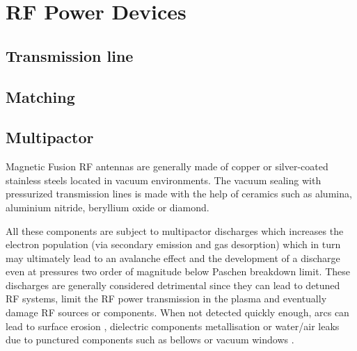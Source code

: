 \chapter{RF Power Devices}
\label{chap:rf_power_devices}
\margintoc

\section{Transmission line}

\section{Matching}

\section{Multipactor}


Magnetic Fusion RF antennas are generally made of copper or silver-coated stainless steels located in vacuum environments. The vacuum sealing with pressurized transmission lines is made with the help of ceramics such as alumina, aluminium nitride, beryllium oxide or diamond. 

All these components are subject to multipactor discharges which increases the electron population (via secondary emission and gas desorption) which in turn may ultimately lead to an avalanche effect and the development of a discharge even at pressures two order of magnitude below Paschen breakdown limit. These discharges are generally considered detrimental since they can lead to detuned RF systems, limit the RF power transmission in the plasma and eventually damage RF sources or components. When not detected quickly enough, arcs can lead to surface erosion , dielectric components metallisation  or water/air leaks due to punctured components such as bellows  or vacuum windows . 

